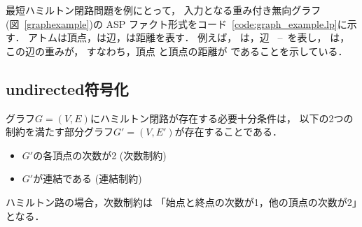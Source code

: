 

最短ハミルトン閉路問題を例にとって，
入力となる重み付き無向グラフ(図~\ref{graphexample})の
ASP ファクト形式をコード~\ref{code:graph_example.lp}に示す．
%
アトムは頂点，は辺，は距離を表す．
例えば，
は，辺
~--~を表し，
は，この辺の重みが，
すなわち，頂点 と頂点の距離が
であることを示している．

\subsection{\textsf{undirected}符号化}



グラフ$G=(V,E)$にハミルトン閉路が存在する必要十分条件は，
以下の2つの制約を満たす部分グラフ$G'=(V,E')$が存在することである．
\begin{itemize}
\item $G'$の各頂点の次数が2 (次数制約)
\item $G'$が連結である (連結制約)
\end{itemize}
ハミルトン路の場合，次数制約は
「始点と終点の次数が1，他の頂点の次数が2」となる．

